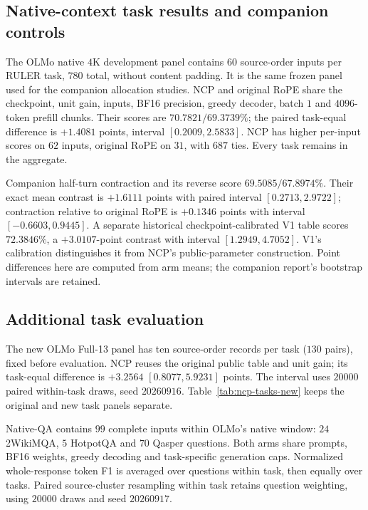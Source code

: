 \subsection{Native-context task results and companion controls}
\label{sec:ncp-results-new}
The OLMo native $4$K development panel contains $60$ source-order inputs per
RULER task, $780$ total, without content padding. It is the same frozen panel
used for the companion allocation studies. NCP and original RoPE share the
checkpoint, unit gain, inputs, BF16 precision, greedy decoder, batch $1$ and
$4096$-token prefill chunks. Their scores are $70.7821/69.3739\%$;
the paired task-equal difference is $+1.4081$ points, interval
$[0.2009,2.5833]$. NCP has higher per-input scores on $62$ inputs,
original RoPE on $31$, with $687$ ties. Every task remains in the aggregate.



Companion half-turn contraction and its reverse score $69.5085/67.8974\%$.
Their exact mean contrast is $+1.6111$ points with paired interval
$[0.2713,2.9722]$; contraction relative to original RoPE is $+0.1346$
points with interval $[-0.6603,0.9445]$. A separate historical
checkpoint-calibrated V1 table scores $72.3846\%$, a $+3.0107$-point
contrast with interval $[1.2949,4.7052]$. V1's calibration distinguishes it
from NCP's public-parameter construction. Point differences here are computed
from arm means; the companion report's bootstrap intervals are retained.
\FloatBarrier

\subsection{Additional task evaluation}
\label{sec:native-confirmation-new}
The new OLMo Full-13 panel has ten source-order records per task ($130$ pairs),
fixed before evaluation. NCP reuses the original public table and unit gain;
its task-equal difference is $+3.2564$ $[0.8077,5.9231]$ points. The interval
uses $20000$ paired within-task draws, seed $20260916$.
Table~\ref{tab:ncp-tasks-new} keeps the original and new task panels separate.

Native-QA contains $99$ complete inputs within OLMo's native window:
$24$ 2WikiMQA, $5$ HotpotQA and $70$ Qasper questions. Both arms share
prompts, BF16 weights, greedy decoding and task-specific generation caps.
Normalized whole-response token F1 is averaged over questions within task,
then equally over tasks. Paired source-cluster resampling within task retains
question weighting, using $20000$ draws and seed $20260917$.

